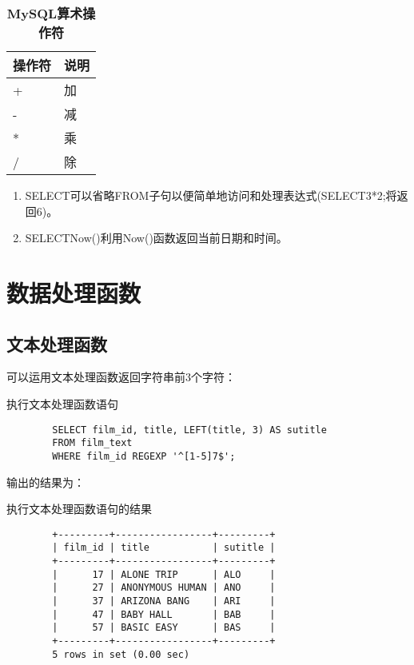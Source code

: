 \documentclass[UTF8]{article}
\begin{document}
\begin{table}[H]
        \caption{\textbf{MySQL算术操作符}}%
        \centering%
        \begin{tabular}{ll}%
        \toprule%
        操作符&说明\\
        \midrule%
        +       &       加                    \\
        -      &       减                  \\
        *     &       乘                  \\
        /       &      除                   \\
        \bottomrule%
        \end{tabular}
\end{table}  

\begin{orangebox}[frametitle={Tips 10.3.1 测试计算}]
\begin{enumerate}
        \item SELECT可以省略FROM子句以便简单地访问和处理表达式(SELECT3*2;将返回6)。
        \item SELECTNow()利用Now()函数返回当前日期和时间。
\end{enumerate}       
\end{orangebox}

\section{数据处理函数}

\subsection{文本处理函数}

可以运用文本处理函数返回字符串前3个字符：

\begin{listing}[H]
	\caption{执行文本处理函数语句}
	\label{code:conducttextfunctionclause}
\begin{verbatim}
        SELECT film_id, title, LEFT(title, 3) AS sutitle 
        FROM film_text 
        WHERE film_id REGEXP '^[1-5]7$';        
\end{verbatim}
\end{listing}

输出的结果为：

\begin{listing}[H]
	\caption{执行文本处理函数语句的结果}
	\label{code:conducttextfunctionclauseresult}
\begin{verbatim}
        +---------+-----------------+---------+
        | film_id | title           | sutitle |
        +---------+-----------------+---------+
        |      17 | ALONE TRIP      | ALO     |
        |      27 | ANONYMOUS HUMAN | ANO     |
        |      37 | ARIZONA BANG    | ARI     |
        |      47 | BABY HALL       | BAB     |
        |      57 | BASIC EASY      | BAS     |
        +---------+-----------------+---------+
        5 rows in set (0.00 sec)
\end{verbatim}
\end{listing}
\end{document}
